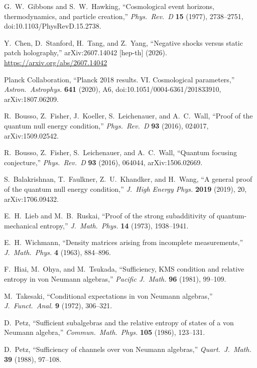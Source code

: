 G.~W.~Gibbons and S.~W.~Hawking,
``Cosmological event horizons, thermodynamics, and particle creation,''
\emph{Phys.\ Rev.\ D} \textbf{15} (1977), 2738--2751,
doi:10.1103/PhysRevD.15.2738.

Y.~Chen, D.~Stanford, H.~Tang, and Z.~Yang,
``Negative shocks versus static patch holography,''
arXiv:2607.14042 [hep-th] (2026).
\url{https://arxiv.org/abs/2607.14042}

Planck Collaboration,
``Planck 2018 results. VI. Cosmological parameters,''
\emph{Astron.\ Astrophys.} \textbf{641} (2020), A6,
doi:10.1051/0004-6361/201833910,
arXiv:1807.06209.

R.~Bousso, Z.~Fisher, J.~Koeller, S.~Leichenauer, and A.~C.~Wall,
``Proof of the quantum null energy condition,''
\emph{Phys.\ Rev.\ D} \textbf{93} (2016), 024017,
arXiv:1509.02542.

R.~Bousso, Z.~Fisher, S.~Leichenauer, and A.~C.~Wall,
``Quantum focusing conjecture,''
\emph{Phys.\ Rev.\ D} \textbf{93} (2016), 064044,
arXiv:1506.02669.

S.~Balakrishnan, T.~Faulkner, Z.~U.~Khandker, and H.~Wang,
``A general proof of the quantum null energy condition,''
\emph{J.\ High Energy Phys.} \textbf{2019} (2019), 20,
arXiv:1706.09432.

E.~H.~Lieb and M.~B.~Ruskai,
``Proof of the strong subadditivity of quantum-mechanical entropy,''
\emph{J.\ Math.\ Phys.} \textbf{14} (1973), 1938--1941.

E.~H.~Wichmann,
``Density matrices arising from incomplete measurements,''
\emph{J.\ Math.\ Phys.} \textbf{4} (1963), 884--896.

F.~Hiai, M.~Ohya, and M.~Tsukada,
``Sufficiency, KMS condition and relative entropy in von Neumann algebras,''
\emph{Pacific J.\ Math.} \textbf{96} (1981), 99--109.

M.~Takesaki,
``Conditional expectations in von Neumann algebras,''
\emph{J.\ Funct.\ Anal.} \textbf{9} (1972), 306--321.

D.~Petz,
``Sufficient subalgebras and the relative entropy of states of a von Neumann algebra,''
\emph{Commun.\ Math.\ Phys.} \textbf{105} (1986), 123--131.

D.~Petz,
``Sufficiency of channels over von Neumann algebras,''
\emph{Quart.\ J.\ Math.} \textbf{39} (1988), 97--108.


